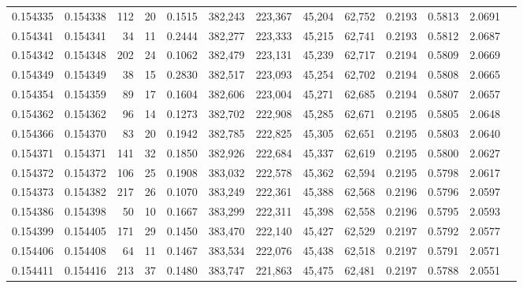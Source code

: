 \begin{tabular}{rrrrrrrrrrrrr}
0.154335 & 0.154338 &   112 &  20 &                                     0.1515 & 382,243 & 223,367 &  45,204 &  62,752 & 0.2193 & 0.5813 & 2.0691 \\
0.154341 & 0.154341 &    34 &  11 &                                     0.2444 & 382,277 & 223,333 &  45,215 &  62,741 & 0.2193 & 0.5812 & 2.0687 \\
0.154342 & 0.154348 &   202 &  24 &                                     0.1062 & 382,479 & 223,131 &  45,239 &  62,717 & 0.2194 & 0.5809 & 2.0669 \\
0.154349 & 0.154349 &    38 &  15 &                                     0.2830 & 382,517 & 223,093 &  45,254 &  62,702 & 0.2194 & 0.5808 & 2.0665 \\
0.154354 & 0.154359 &    89 &  17 &                                     0.1604 & 382,606 & 223,004 &  45,271 &  62,685 & 0.2194 & 0.5807 & 2.0657 \\
0.154362 & 0.154362 &    96 &  14 &                                     0.1273 & 382,702 & 222,908 &  45,285 &  62,671 & 0.2195 & 0.5805 & 2.0648 \\
0.154366 & 0.154370 &    83 &  20 &                                     0.1942 & 382,785 & 222,825 &  45,305 &  62,651 & 0.2195 & 0.5803 & 2.0640 \\
0.154371 & 0.154371 &   141 &  32 &                                     0.1850 & 382,926 & 222,684 &  45,337 &  62,619 & 0.2195 & 0.5800 & 2.0627 \\
0.154372 & 0.154372 &   106 &  25 &                                     0.1908 & 383,032 & 222,578 &  45,362 &  62,594 & 0.2195 & 0.5798 & 2.0617 \\
0.154373 & 0.154382 &   217 &  26 &                                     0.1070 & 383,249 & 222,361 &  45,388 &  62,568 & 0.2196 & 0.5796 & 2.0597 \\
0.154386 & 0.154398 &    50 &  10 &                                     0.1667 & 383,299 & 222,311 &  45,398 &  62,558 & 0.2196 & 0.5795 & 2.0593 \\
0.154399 & 0.154405 &   171 &  29 &                                     0.1450 & 383,470 & 222,140 &  45,427 &  62,529 & 0.2197 & 0.5792 & 2.0577 \\
0.154406 & 0.154408 &    64 &  11 &                                     0.1467 & 383,534 & 222,076 &  45,438 &  62,518 & 0.2197 & 0.5791 & 2.0571 \\
0.154411 & 0.154416 &   213 &  37 &                                     0.1480 & 383,747 & 221,863 &  45,475 &  62,481 & 0.2197 & 0.5788 & 2.0551 \\

\end{tabular}
